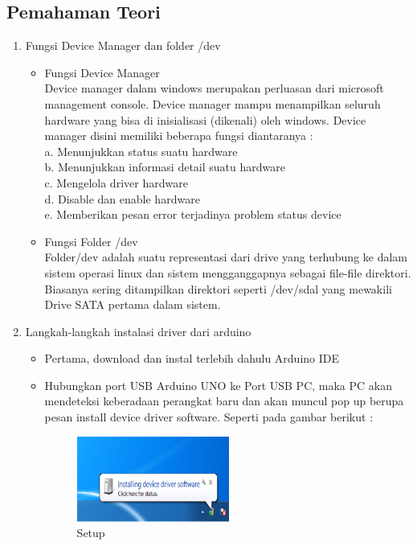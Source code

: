 \subsection{Pemahaman Teori}
\begin{enumerate}

\item Fungsi Device Manager dan folder /dev
\begin{itemize}
\item Fungsi Device Manager\\
Device manager dalam windows merupakan perluasan dari microsoft management console. Device manager mampu menampilkan seluruh hardware yang bisa di inisialisasi (dikenali) oleh windows. Device manager disini memiliki beberapa fungsi diantaranya :\\
a.	Menunjukkan status suatu hardware\\
b.	Menunjukkan informasi detail suatu hardware\\
c.	Mengelola driver hardware\\
d.	Disable dan enable hardware\\
e.	Memberikan pesan error terjadinya problem status device\\
\item Fungsi Folder /dev\\
Folder/dev adalah suatu representasi dari drive yang terhubung ke dalam sistem operasi linux dan sistem mengganggapnya sebagai file-file direktori. Biasanya sering ditampilkan direktori seperti /dev/sdal yang mewakili Drive SATA pertama dalam sistem.
\end{itemize}

\item Langkah-langkah instalasi driver dari arduino
\begin{itemize}
\item Pertama, download dan instal terlebih dahulu Arduino IDE

\item Hubungkan port USB Arduino UNO ke Port USB PC, maka PC akan mendeteksi keberadaan perangkat baru dan akan muncul pop up berupa pesan install device driver software. Seperti pada gambar berikut :
\begin{figure}[ht!]
\includegraphics[width=5cm]{figures/5/1174054/1.png}
\centering
\caption{Setup}
\end{figure}


\end{itemize}
\end{enumerate}

